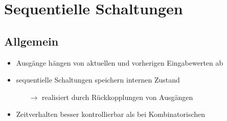 
\section{Sequentielle Schaltungen}
\subsection{Allgemein}

\begin{itemize}
\item Ausgänge hängen von aktuellen und vorherigen Eingabewerten ab
\item sequentielle Schaltungen speichern internen Zustand
	\begin{itemize}
	\item[$\rightarrow$] realisiert durch Rückkopplungen von Ausgängen
	\end{itemize}

\item Zeitverhalten besser kontrollierbar als bei Kombinatorischen
\end{itemize}


